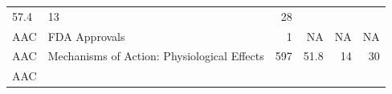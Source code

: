 \documentclass[11pt,]{article}
\begin{document}
\begin{longtable}[]{@{}llrrrr@{}}
\begin{minipage}[t]{0.08\columnwidth}
57.4\strut
\end{minipage} & \begin{minipage}[t]{0.11\columnwidth}\raggedleft\strut
13\strut
\end{minipage} & \begin{minipage}[t]{0.11\columnwidth}\raggedleft\strut
28\strut
\end{minipage}\tabularnewline
\begin{minipage}[t]{0.06\columnwidth}\raggedright\strut
AAC\strut
\end{minipage} & \begin{minipage}[t]{0.43\columnwidth}\raggedright\strut
FDA Approvals\strut
\end{minipage} & \begin{minipage}[t]{0.04\columnwidth}\raggedleft\strut
1\strut
\end{minipage} & \begin{minipage}[t]{0.08\columnwidth}\raggedleft\strut
NA\strut
\end{minipage} & \begin{minipage}[t]{0.11\columnwidth}\raggedleft\strut
NA\strut
\end{minipage} & \begin{minipage}[t]{0.11\columnwidth}\raggedleft\strut
NA\strut
\end{minipage}\tabularnewline
\begin{minipage}[t]{0.06\columnwidth}\raggedright\strut
AAC\strut
\end{minipage} & \begin{minipage}[t]{0.43\columnwidth}\raggedright\strut
Mechanisms of Action: Physiological Effects\strut
\end{minipage} & \begin{minipage}[t]{0.04\columnwidth}\raggedleft\strut
597\strut
\end{minipage} & \begin{minipage}[t]{0.08\columnwidth}\raggedleft\strut
51.8\strut
\end{minipage} & \begin{minipage}[t]{0.11\columnwidth}\raggedleft\strut
14\strut
\end{minipage} & \begin{minipage}[t]{0.11\columnwidth}\raggedleft\strut
30\strut
\end{minipage}\tabularnewline
\begin{minipage}[t]{0.06\columnwidth}\raggedright\strut
AAC\strut
\end{minipage} & \begin{minipage}[t]{0.43\columnwidth}\raggedright\strut

\end{minipage}
\end{longtable}
\end{document}
